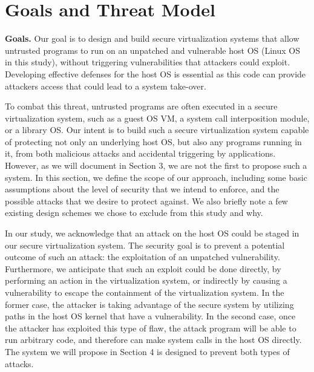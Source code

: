 \section{Goals and Threat Model}
\label{sec.motivation-and-background}

\textbf{Goals.}
Our goal is to design and build secure virtualization systems that allow
untrusted programs to run on an unpatched and vulnerable host OS (Linux OS in
 this study), without triggering vulnerabilities that attackers could exploit.
 Developing effective defenses for the host OS is essential as this code
 can provide attackers access that could lead to a system take-over.

To combat this threat, untrusted programs are often executed in a secure
 virtualization system, such as a guest OS VM, a system call interposition
 module, or a library OS. Our intent is to
build such a secure virtualization system capable of protecting not only
an underlying host OS, but also any programs running in it, from both malicious attacks
and accidental triggering by applications. However, as we will document
in Section 3, we are not the first to propose such a system.
In this section, we define the scope of our approach, including some basic
assumptions about the level of security that we intend to enforce,
and the possible attacks that we desire to protect against. We also briefly note
a few existing design schemes we chose to exclude from this study and why.

In our study, we acknowledge that an attack on the host OS could be staged in our secure
virtualization system. The security goal is to prevent a potential outcome of such
an attack: the exploitation of an unpatched vulnerability. Furthermore, we
anticipate that such an exploit could be done directly, by performing an action in the
virtualization system, or indirectly by causing a vulnerability to escape the
containment of the virtualization system.  In the former case, the attacker is
taking advantage of the secure system by utilizing paths in the host OS kernel
that have a vulnerability. In the second case, once the attacker has exploited
this type of flaw, the attack program will be able to run arbitrary code, and
therefore can make system calls in the host OS directly. The system we will propose
in Section 4 is designed to prevent both types of attacks.

